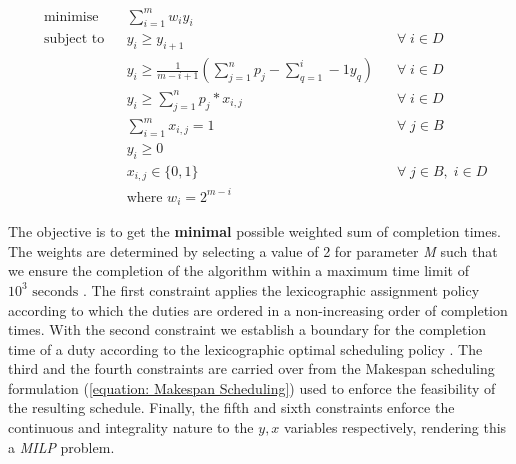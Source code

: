 
\vspace{\baselineskip}
\begin{equation}
\label{equation: Lexicographic weighting}
\begin{aligned}
&\text{minimise}
& & \sum _{i=1}^m w_{i}y_{i}    \\ 
& \text{subject to}
& & y_i \geq y_{i+1} \;\;\; &\forall \; i \in D\\   
& & & y_i \geq \frac{1}{m-i+1} (\sum _{j=1}^n p_{j} - \sum _{q=1}^i-1 y_q)  \;\;\; &\forall \; i \in D\\   
& & & y_i \geq \sum _{j=1}^n p_{j}*x_{i,j} \;\;\; &\forall \; i \in D\\   
& & &\sum _{i=1}^m x_{i,j} = 1 \;\;\; &\forall \; j \in B\\
& & & y_i\geq 0  \\
& & & x_{i,j} \in  \{ 0,1 \} \;\;\; &\forall \; j \in B, \; i \in D\\
& & & \text{where } w_i = 2^{m-i}
\end{aligned}
\end{equation}

\vspace{\baselineskip}
\noindent
The objective is to get the \textbf{minimal} possible weighted sum of completion times. The weights are determined by selecting a value of 2 for parameter \textit{M} such that we ensure the completion of the algorithm within a maximum time limit of $10^{3} \text{ seconds}$ \cite{DBLP:journals/corr/abs-1805-03437}. The first constraint applies the lexicographic assignment policy according to which the duties are ordered in a non-increasing order of completion times. With the second constraint we establish a boundary for the completion time of a duty according to the lexicographic optimal scheduling policy \cite{DBLP:journals/corr/abs-1805-03437}. The third and the fourth constraints are carried over from the Makespan scheduling formulation (\ref{equation: Makespan Scheduling}) used to enforce the feasibility of the resulting schedule. Finally, the fifth and sixth constraints enforce the continuous and integrality nature to the $y,x$ variables respectively, rendering this a \textit{MILP} problem.

